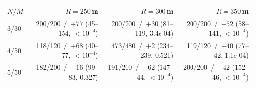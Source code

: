 \begin{tabular}{lrrr}
\toprule
$N/M$ & $R=250$\,m & $R=300$\,m & $R=350$\,m \\
\midrule
3/30 & 200/200 \,/\, $+77$ (45--154, $<10^{-4}$) & 200/200 \,/\, $+30$ (81--119, 3.4e-04) & 200/200 \,/\, $+52$ (58--141, $<10^{-4}$) \\
4/50 & 118/120 \,/\, $+68$ (40--77, $<10^{-4}$) & 473/480 \,/\, $+2$ (234--239, 0.521) & 119/120 \,/\, $-40$ (77--42, 1.1e-04) \\
5/50 & 182/200 \,/\, $-16$ (99--83, 0.327) & 191/200 \,/\, $-62$ (147--44, $<10^{-4}$) & 200/200 \,/\, $-42$ (152--46, $<10^{-4}$) \\
\bottomrule
\end{tabular}%
